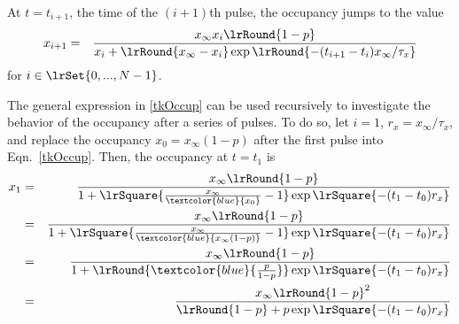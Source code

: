 \documentclass[11pt,landscape]{article}
\begin{document}
At $t=t_{i+1}$, the time of the $(i+1)$th 
pulse,  the occupancy jumps to the value 
\begin{eqnarray}
x_{i+1} 
&=& \frac{x_{\infty} {x_{i}}  \lrRound{1-p} }{{x_{i}} + \lrRound{x_{\infty}- x_{i}}
\exp\lrRound{- (t_{i+1}-t_{i}) x_{\infty} / \tau_x }}
\label{tkOccup}
\end{eqnarray}
for $i \in \lrSet{0,...,N-1}$. 


The general expression in \eqref{tkOccup} can be used recursively to
investigate the behavior of the occupancy after a series of pulses. To
do so, let $i=1$, $r_x=x_{\infty} / \tau_x$, and replace the occupancy
$x_0=x_{\infty}(1-p)$ after the first pulse  into Eqn.~\eqref{tkOccup}.
Then, the occupancy at $t=t_1$ is
\begin{eqnarray}
x_1 
&=& \frac{x_{\infty} \lrRound{1-p}}
{1 + \lrSquare{ \frac{x_{\infty}}{\textcolor{blue}{x_0}} -1}
\exp\lrSquare{- (t_1-t_0) r_x }}
\nonumber
\label{t1Occup0}
\\
&=& \frac{x_{\infty} \lrRound{1-p}}
{1 + \lrSquare{ \frac{x_{\infty}}
{\textcolor{blue}{x_{\infty}(1-p) }} -1}
\exp\lrSquare{- (t_1-t_0) r_x }}
\nonumber
\label{t1Occup1}
\\
&=& \frac{ x_{\infty} \lrRound{1-p}}
{1 + \lrRound{ 
\textcolor{blue}{\frac{p}{1-p}}}
\exp\lrSquare{- (t_1-t_0) r_x }}
\nonumber
\label{t1Occup2}
\\
&=& \frac{ x_{\infty} \lrRound{1-p}^2}
{ \lrRound{1-p} + p \exp\lrSquare{- (t_1-t_0) r_x }}
\label{t1Occup3}
\end{eqnarray}
\end{document}
